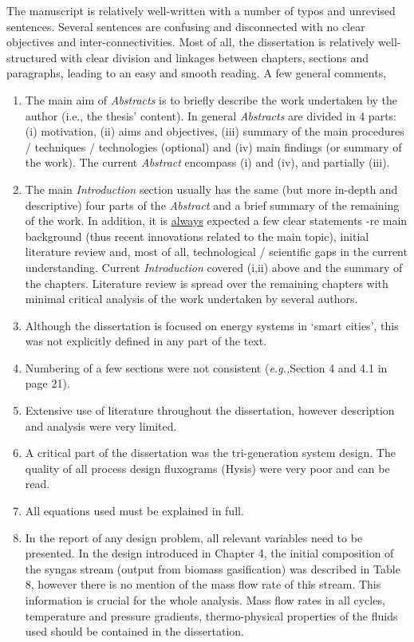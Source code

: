\documentclass[14pt,twoside]{report}
\newcommand{\eg}{{\it e.g.,}}
\begin{document}
\begin{description}
The manuscript is relatively well-written with a number of typos and unrevised sentences. Several sentences are confusing and disconnected with no clear objectives and inter-connectivities. Most of all, the dissertation is relatively well-structured with clear division and linkages between chapters, sections and paragraphs, leading to an easy and smooth reading.  A few general comments,
\begin{enumerate}
%
\item The main aim of {\it Abstracts} is to briefly describe the work undertaken by the author (i.e., the thesis' content). In general {\it Abstracts} are divided in 4 parts: (i) motivation, (ii) aims and objectives, (iii) summary of the main procedures / techniques / technologies (optional) and (iv) main findings (or summary of the work). The current {\it Abstract} encompass (i) and (iv), and partially (iii).
%
\item The main {\it Introduction} section usually has the same (but more in-depth and descriptive) four parts of the {\it Abstract} and a brief summary of the remaining of the work. In addition, it is \underline{always} expected a few clear statements -re main background (thus recent innovations related to the main topic), initial literature review and, most of all, technological / scientific gaps in the current understanding. Current {\it Introduction} covered (i,ii) above and the summary of the chapters. Literature review is spread over the remaining chapters with minimal critical analysis of the work undertaken by several authors. 
%
\item Although the dissertation is focused on energy systems in `smart cities', this was not explicitly defined in any part of the text.
%
\item Numbering of a few sections were not consistent (\eg Section 4 and 4.1 in page 21).
%
\item Extensive use of literature throughout the dissertation, however description and analysis were very limited.
%
\item A critical part of the dissertation was the tri-generation system design. The quality of all process design fluxograms (Hysis) were very poor and can be read. 
%
\item All equations used must be explained in full.
%
\item In the report of any design problem, all relevant variables need to be presented. In the design introduced in Chapter 4, the initial composition of the syngas stream (output from biomass gasification) was described in Table 8, however there is no mention of the mass flow rate of this stream. This information is crucial for the whole analysis. Mass flow rates in all cycles, temperature and pressure gradients, thermo-physical properties of the fluids used  should be contained in the dissertation. 

\end{enumerate}
\end{description}
\end{document}
